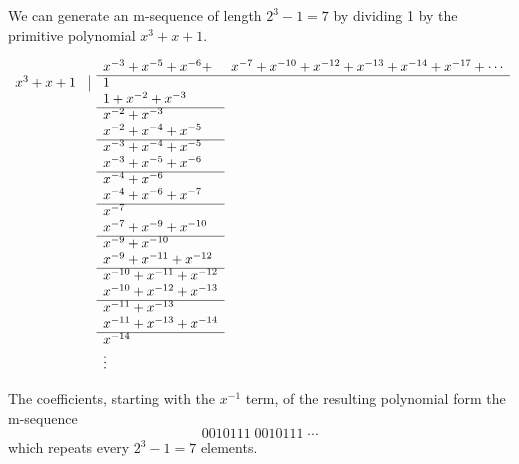 \begin{example}
\label{ex:1/p(x)}
We can generate an m-sequence of length
$2^3-1=7$ by dividing 1 by the primitive polynomial $x^3+x+1$.

\begin{fsL}
\[
\begin{array}{rrll}
           &   & x^{-3} + x^{-5} + x^{-6} +& x^{-7} + x^{-10} + x^{-12} + x^{-13} + x^{-14} + x^{-17} + \cdots \\
   \cline{3-4}
   x^3+x+1 & \vline & 1 \\
           &        & 1 + x^{-2} + x^{-3} \\
   \cline{3-3}
           &        & x^{-2} + x^{-3} \\
           &        & x^{-2} + x^{-4} + x^{-5} \\
   \cline{3-3}
           &        & x^{-3} + x^{-4} + x^{-5} \\
           &        & x^{-3} + x^{-5} + x^{-6} \\
   \cline{3-3}
           &        & x^{-4} + x^{-6}          \\
           &        & x^{-4} + x^{-6} + x^{-7} \\
   \cline{3-3}
           &        & x^{-7}                   \\
           &        & x^{-7} + x^{-9} + x^{-10} \\
   \cline{3-3}
           &        & x^{-9} + x^{-10}         \\
           &        & x^{-9} + x^{-11} + x^{-12} \\
   \cline{3-3}
           &        & x^{-10} + x^{-11} + x^{-12} \\
           &        & x^{-10} + x^{-12} + x^{-13} \\
   \cline{3-3}
           &        & x^{-11} + x^{-13}          \\
           &        & x^{-11} + x^{-13} + x^{-14} \\
   \cline{3-3}
           &        & x^{-14}           \\
           &        & \vdots
\end{array}
\]
\end{fsL}
The coefficients, starting with the $x^{-1}$ term,
of the resulting polynomial form the m-sequence
\[ 0010111 \; 0010111 \; \cdots \]
which repeats every $2^3-1=7$ elements.
\end{example}


